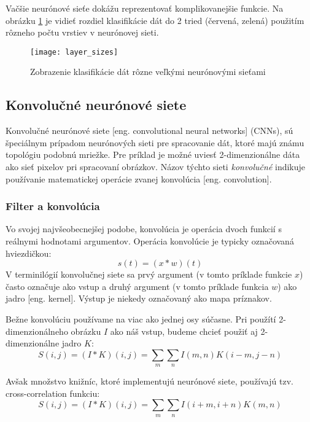 Vačšie neurónové sieťe dokážu reprezentovať komplikovanejšie funkcie.
Na obrázku \ref{pic:XNNLayerExample} je vidieť rozdiel klasifikácie dát do 2 tried (červená, zelená) použitím rôzneho počtu vrstiev v neurónovej sieti.
\begin{figure}[H]
	\centering
	\texttt{[image: layer\_sizes]}
	\caption{Zobrazenie klasifikácie dát rôzne veľkými neurónovými sieťami \cite{odkaz:ConvolutionalNeuralNetworkCS231n}}
	\label{pic:XNNLayerExample}
\end{figure}

\subsection{Konvolučné neurónové siete}
Konvolučné neurónové siete [eng. convolutional neural networks] (CNNs), sú špeciálnym prípadom neurónových sieti pre spracovanie
    dát, ktoré majú známu topológiu podobnú mriežke.
Pre príklad je možné uviesť 2-dimenzionálne dáta ako sieť pixelov pri spracovaní obrázkov.
Názov týchto sieti \textit{konvolučné} indikuje používanie matematickej operácie zvanej konvolúcia [eng. convolution]\cite{book:Goodfellow-et-al-2016}.

\subsubsection{Filter a konvolúcia}
Vo svojej najvšeobecnejšej podobe, konvolúcia je operácia dvoch funkcií s reálnymi hodnotami argumentov.
Operácia konvolúcie je typicky označovaná hviezdičkou:
\begin{equation}
    s(t) = (x * w)(t)
\end{equation}
V terminilógií konvolučnej siete sa prvý argument (v tomto príklade funkcie $x$) často označuje ako vstup a druhý
    argument (v tomto príklade funkcia $w$) ako jadro [eng. kernel]. Výstup je niekedy označovaný ako mapa príznakov.

Bežne konvolúciu používame na viac ako jednej osy súčasne.
Pri použítí 2-dimenzionálneho obrázku $I$ ako náš vstup, budeme chcieť použiť aj 2-dimenzionálne jadro $K$\cite{book:Goodfellow-et-al-2016}:
\begin{equation}
    S(i,j) = (I * K)(i, j) = \sum_m \sum_n I(m,n) K(i - m, j - n)
\end{equation}

Avšak množstvo knižníc, ktoré implementujú neurónové siete, používajú tzv. cross-correlation funkciu\cite{book:Goodfellow-et-al-2016}:
\begin{equation}
    S(i,j) = (I * K)(i, j) = \sum_m \sum_n I(i + m, i + n) K(m, n)
\end{equation}

